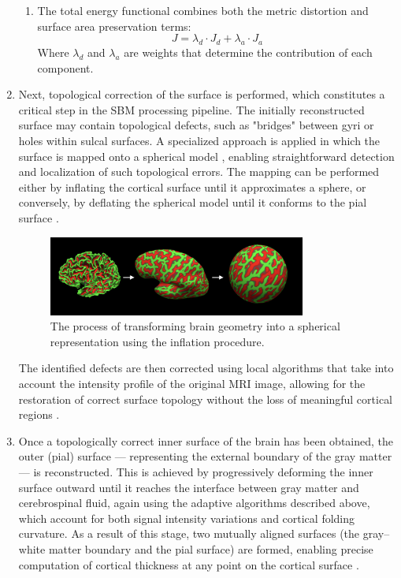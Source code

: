 \documentclass[default]{subfiles}
\begin{document}
\begin{enumerate}
\begin{enumerate}
        \item The total energy functional combines both the metric distortion and surface area preservation terms:
        $$J = \lambda_d \cdot J_d + \lambda_a \cdot J_a$$
        Where $\lambda_d$ and $\lambda_a$ are weights that determine the contribution of each component.
    \end{enumerate}

    \item Next, topological correction of the surface is performed, which constitutes a critical step in the SBM
    processing pipeline. The initially reconstructed surface may contain topological defects, such as "bridges"
    between gyri or holes within sulcal surfaces. A specialized approach is applied in which the surface is mapped onto
    a spherical model \cite{fischl_1999}, enabling straightforward detection and localization of such topological
    errors. The mapping can be performed either by inflating the cortical surface until it approximates a sphere, or
    conversely, by deflating the spherical model until it conforms to the pial surface \cite{fischl_2001, dale_1999}.

    \begin{figure}[H]
        \centering
        \includegraphics[width=0.8\textwidth]{image/pic2.png}
        \caption{
          The process of transforming brain geometry into a spherical representation using the inflation procedure.
        }
    \end{figure}

    The identified defects are then corrected using local algorithms that take into account the intensity profile of
    the original MRI image, allowing for the restoration of correct surface topology without the loss of meaningful
    cortical regions \cite{acosta_2012}.

    \item Once a topologically correct inner surface of the brain has been obtained, the outer (pial) surface —
    representing the external boundary of the gray matter — is reconstructed. This is achieved by progressively
    deforming the inner surface outward until it reaches the interface between gray matter and cerebrospinal fluid,
    again using the adaptive algorithms described above, which account for both signal intensity variations and
    cortical folding curvature. As a result of this stage, two mutually aligned surfaces (the gray–white matter
    boundary and the pial surface) are formed, enabling precise computation of cortical thickness at any point on the
    cortical surface \cite{fischl_2008, fischl_2004}.


\end{enumerate}
\end{document}
